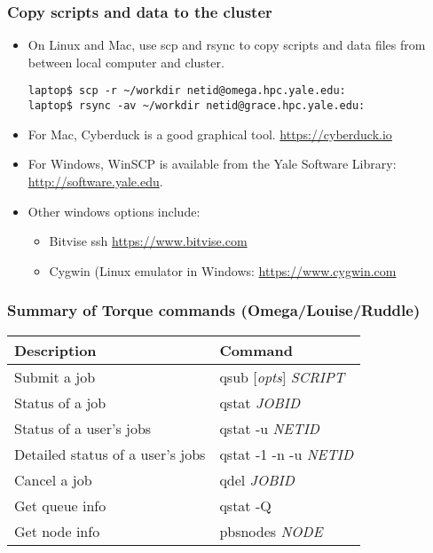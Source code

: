 \documentclass[10pt]{beamer}
\begin{document}

\begin{frame}[fragile]
\frametitle{Copy scripts and data to the cluster}
\begin{itemize}
\item On Linux and Mac, use scp and rsync
to copy scripts and data files from between local computer and cluster.

\begin{verbatim}
laptop$ scp -r ~/workdir netid@omega.hpc.yale.edu:
laptop$ rsync -av ~/workdir netid@grace.hpc.yale.edu:
\end{verbatim}

\item For Mac, Cyberduck is a good graphical tool.  \url{https://cyberduck.io}

\item For Windows, WinSCP is available from the Yale Software
Library: \url{http://software.yale.edu}.


\item Other windows options include:
\begin{itemize}
\item Bitvise ssh \url{https://www.bitvise.com}
\item Cygwin (Linux emulator in Windows: \url{https://www.cygwin.com}
\end{itemize}
\end{itemize}



\end{frame}

\begin{frame}
\frametitle{Summary of Torque commands (Omega/Louise/Ruddle)}
\begin{tabular}{|l|l|}
\hline
\textbf{Description} & \textbf{Command} \\
\hline
Submit a job & qsub [\textit{opts}] \textit{SCRIPT} \\
\hline
Status of a job & qstat \textit{JOBID} \\
\hline
Status of a user's jobs & qstat -u \textit{NETID} \\
\hline
Detailed status of a user's jobs & qstat -1 -n -u \textit{NETID} \\
\hline
Cancel a job & qdel \textit{JOBID} \\
\hline
Get queue info & qstat -Q \\
\hline
Get node info & pbsnodes \textit{NODE} \\
\hline
\end{tabular}
\end{frame}
\end{document}
